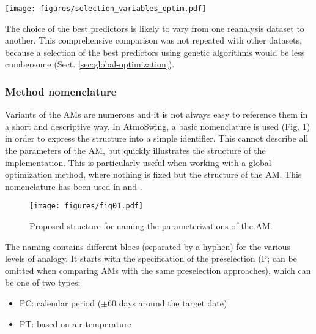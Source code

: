 \documentclass[review]{elsarticle}
\begin{document}
\begin{figure*}[hbt!]
	\texttt{[image: figures/selection\_variables\_optim.pdf]}
	\caption{Performance score (CRPSS) of the 30 best variables from the NCEP/NCAR reanalysis dataset, when considered separately (no combination), for the Chablais region and the southeast ridges. The analogy criterion is S1 when there is an asterisk next to the variable name, and RMSE otherwise. Colour illustrates the variable type: green = atmospheric circulation, blue = moisture, orange = temperature, yellow = radiation, purple = vertical velocity, and gray = other. SLP stands for sea level pressure and Z for geopotential height. The blue square indicates the Binn station, which is analyzed in more detail later on.} 
	\label{figure:variable_exploration}
\end{figure*}

The choice of the best predictors is likely to vary from one reanalysis dataset to another. This comprehensive comparison was not repeated with other datasets, because a selection of the best predictors using genetic algorithms would be less cumbersome (Sect. \ref{sec:global-optimization}).


\subsubsection{Method nomenclature}

Variants of the AMs are numerous and it is not always easy to reference them in a short and descriptive way. In AtmoSwing, a basic nomenclature is used (Fig. \ref{figure:nomenclature}) in order to express the structure into a simple identifier. This cannot describe all the parameters of the AM, but quickly illustrates the structure of the implementation. This is particularly useful when working with a global optimization method, where nothing is fixed but the structure of the AM. This nomenclature has been used in \citet{Horton2017a, Horton2017b, Horton2018a} and \citet{Horton2018b}.

\begin{figure}[hbt!]
	\texttt{[image: figures/fig01.pdf]}
	\caption{Proposed structure for naming the parameterizations of the AM.}
	\label{figure:nomenclature}
\end{figure}

The naming contains different blocs (separated by a hyphen) for the various levels of analogy. It starts with the specification of the preselection (P; can be omitted when comparing AMs with the same preselection approaches), which can be one of two types:
\begin{itemize}
	\item PC: calendar period ($\pm 60$ days around the target date)
	\item PT: based on air temperature \citep{BenDaoud2010}
\end{itemize}
\end{document}
